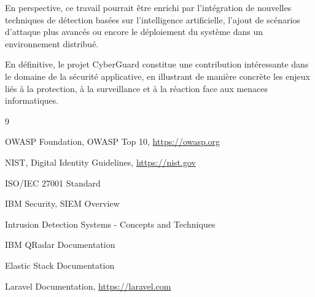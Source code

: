 \documentclass[a4paper,12pt]{report}
\begin{document}
    En perspective, ce travail pourrait être enrichi par l’intégration de nouvelles techniques de détection basées sur l’intelligence artificielle, l’ajout de scénarios d’attaque plus avancés ou encore le déploiement du système dans un environnement distribué.
    
    En définitive, le projet CyberGuard constitue une contribution intéressante dans le domaine de la sécurité applicative, en illustrant de manière concrète les enjeux liés à la protection, à la surveillance et à la réaction face aux menaces informatiques.
    
    \newpage
    \begin{thebibliography}{9}
        
        OWASP Foundation, OWASP Top 10, \url{https://owasp.org}
        
        NIST, Digital Identity Guidelines, \url{https://nist.gov}
        
        ISO/IEC 27001 Standard
        
        IBM Security, SIEM Overview
        
        Intrusion Detection Systems - Concepts and Techniques
        
        IBM QRadar Documentation
        
        Elastic Stack Documentation
        
        Laravel Documentation, \url{https://laravel.com}
        
    \end{thebibliography}
    
\end{document}
